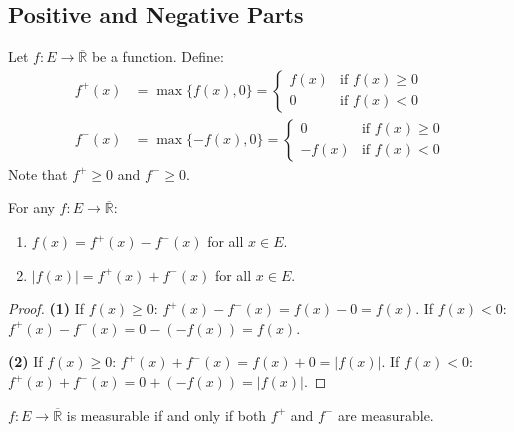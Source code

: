 \documentclass[11pt]{report}
\begin{document}
\subsection{Positive and Negative Parts}

\begin{defbox}
Let $f: E \to \overline{\mathbb{R}}$ be a function. Define:
\begin{align*}
f^+(x) &= \max\{f(x), 0\} = \begin{cases} f(x) & \text{if } f(x) \geq 0 \\ 0 & \text{if } f(x) < 0 \end{cases} \\[1ex]
f^-(x) &= \max\{-f(x), 0\} = \begin{cases} 0 & \text{if } f(x) \geq 0 \\ -f(x) & \text{if } f(x) < 0 \end{cases}
\end{align*}
Note that $f^+ \geq 0$ and $f^- \geq 0$.
\end{defbox}

\begin{propbox}
For any $f: E \to \overline{\mathbb{R}}$:
\begin{enumerate}
    \item $f(x) = f^+(x) - f^-(x)$ for all $x \in E$.
    \item $|f(x)| = f^+(x) + f^-(x)$ for all $x \in E$.
\end{enumerate}
\end{propbox}

\begin{proof}
\textbf{(1)} If $f(x) \geq 0$: $f^+(x) - f^-(x) = f(x) - 0 = f(x)$. If $f(x) < 0$: $f^+(x) - f^-(x) = 0 - (-f(x)) = f(x)$.

\textbf{(2)} If $f(x) \geq 0$: $f^+(x) + f^-(x) = f(x) + 0 = |f(x)|$. If $f(x) < 0$: $f^+(x) + f^-(x) = 0 + (-f(x)) = |f(x)|$.
\end{proof}

\begin{propbox}
$f: E \to \overline{\mathbb{R}}$ is measurable if and only if both $f^+$ and $f^-$ are measurable.
\end{propbox}
\end{document}
